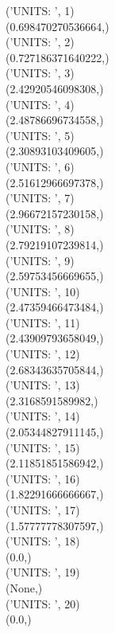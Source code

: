 ('UNITS: ', 1) \\
(0.698470270536664,) \\
('UNITS: ', 2) \\
(0.727186371640222,) \\
('UNITS: ', 3) \\
(2.42920546098308,) \\
('UNITS: ', 4) \\
(2.48786696734558,) \\
('UNITS: ', 5) \\
(2.30893103409605,) \\
('UNITS: ', 6) \\
(2.51612966697378,) \\
('UNITS: ', 7) \\
(2.96672157230158,) \\
('UNITS: ', 8) \\
(2.79219107239814,) \\
('UNITS: ', 9) \\
(2.59753456669655,) \\
('UNITS: ', 10) \\
(2.47359466473484,) \\
('UNITS: ', 11) \\
(2.43909793658049,) \\
('UNITS: ', 12) \\
(2.68343635705844,) \\
('UNITS: ', 13) \\
(2.3168591589982,) \\
('UNITS: ', 14) \\
(2.05344827911145,) \\
('UNITS: ', 15) \\
(2.11851851586942,) \\
('UNITS: ', 16) \\
(1.82291666666667,) \\
('UNITS: ', 17) \\
(1.57777778307597,) \\
('UNITS: ', 18) \\
(0.0,) \\
('UNITS: ', 19) \\
(None,) \\
('UNITS: ', 20) \\
(0.0,) \\
